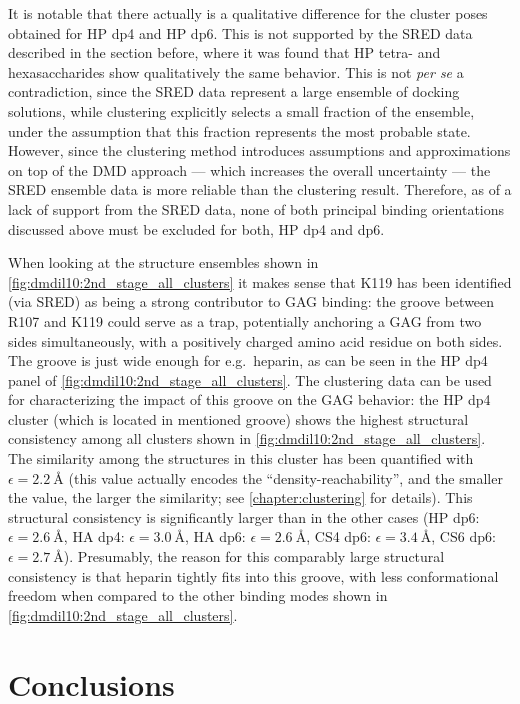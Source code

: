 It is notable that there actually is a qualitative difference for the cluster
poses obtained for HP dp4 and HP dp6. This is not supported by the SRED data
described in the section before, where it was found that HP tetra- and
hexasaccharides show qualitatively the same behavior. This is not \textit{per
se} a contradiction, since the SRED data represent a large ensemble of docking
solutions, while clustering explicitly selects a small fraction of the ensemble,
under the assumption that this fraction represents the most probable state.
However, since the clustering method introduces assumptions and approximations
on top of the DMD approach --- which increases the overall uncertainty --- the
SRED ensemble data is more reliable than the clustering result. Therefore, as of
a lack of support from the SRED data, none of both principal binding
orientations discussed above must be excluded for both, HP dp4 and dp6.

When looking at the structure ensembles shown in
\cref{fig:dmdil10:2nd_stage_all_clusters} it makes sense that K119 has been
identified (via SRED) as being a strong contributor to GAG binding: the groove
between R107 and K119 could serve as a trap, potentially anchoring a GAG from
two sides simultaneously, with a positively charged amino acid residue on both
sides. The groove is just wide enough for e.g.\ heparin, as can be seen in the
HP dp4 panel of \cref{fig:dmdil10:2nd_stage_all_clusters}. The clustering data
can be used for characterizing the impact of this groove on the GAG behavior:
the HP dp4 cluster (which is located in mentioned groove) shows the highest
structural consistency among all clusters shown in
\cref{fig:dmdil10:2nd_stage_all_clusters}. The similarity among the structures
in this cluster has been quantified with $\epsilon = \SI{2.2}{\angstrom}$ (this
value actually encodes the \enquote{density-reachability}, and the smaller the
value, the larger the similarity; see \cref{chapter:clustering} for details).
This structural consistency is significantly larger than in the other cases (HP
dp6: $\epsilon = \SI{2.6}{\angstrom}$, HA dp4: $\epsilon = \SI{3.0}{\angstrom}$,
HA dp6: $\epsilon = \SI{2.6}{\angstrom}$, CS4 dp6: $\epsilon =
\SI{3.4}{\angstrom}$, CS6 dp6: $\epsilon = \SI{2.7}{\angstrom}$). Presumably,
the reason for this comparably large structural consistency is that heparin
tightly fits into this groove, with less conformational freedom when compared to
the other binding modes shown in \cref{fig:dmdil10:2nd_stage_all_clusters}.


\section{Conclusions}

